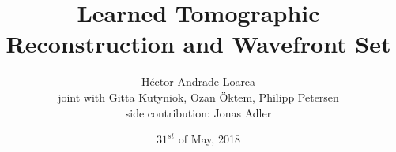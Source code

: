 \title[AFG Oberseminar]{Learned Tomographic Reconstruction and Wavefront Set}
\author[H\'ector Andrade Loarca (TUB)]{H\'ector Andrade Loarca\\
				\scriptsize{joint with Gitta Kutyniok, Ozan \"Oktem, Philipp Petersen}\\
				\scriptsize{side contribution: Jonas Adler}}
\date[31.05.2018]{$31^{st}$ of May, 2018}


\newcommand{\mylogo}{\texttt{[image: ./Images/AFG.pdf]}}

\begin{frame}[plain]
	\titlepage
\end{frame}

